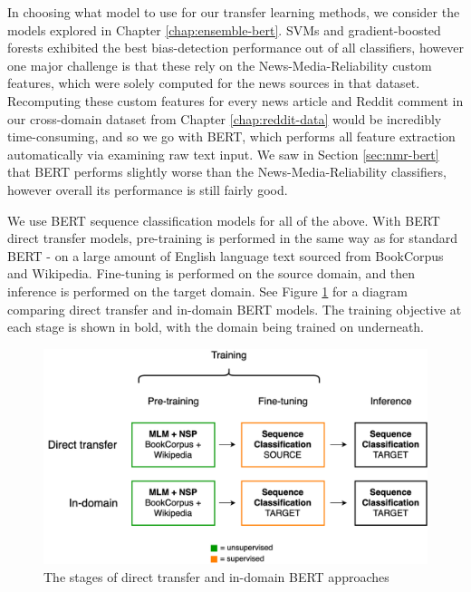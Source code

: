 In choosing what model to use for our transfer learning methods, we consider the models explored in Chapter \ref{chap:ensemble-bert}. SVMs and gradient-boosted forests exhibited the best bias-detection performance out of all classifiers, however one major challenge is that these rely on the News-Media-Reliability custom features, which were solely computed for the news sources in that dataset. Recomputing these custom features for every news article and Reddit comment in our cross-domain dataset from Chapter \ref{chap:reddit-data} would be incredibly time-consuming, and so we go with BERT, which performs all feature extraction automatically via examining raw text input. We saw in Section \ref{sec:nmr-bert} that BERT performs slightly worse than the News-Media-Reliability classifiers, however overall its performance is still fairly good.

We use BERT sequence classification models for all of the above. With BERT direct transfer models, pre-training is performed in the same way as for standard BERT - on a large amount of English language text sourced from BookCorpus and Wikipedia. Fine-tuning is performed on the source domain, and then inference is performed on the target domain. See Figure \ref{fig:direct-transfer-in-domain-bert} for a diagram comparing direct transfer and in-domain BERT models. The training objective at each stage is shown in bold, with the domain being trained on underneath.

\begin{figure}
    \centering
    \hspace{-1.5cm}
    \includegraphics[scale=0.3]{0-img/direct-transfer-in-domain-bert.png}
    \caption{The stages of direct transfer and in-domain BERT approaches}
    \label{fig:direct-transfer-in-domain-bert}
\end{figure}

